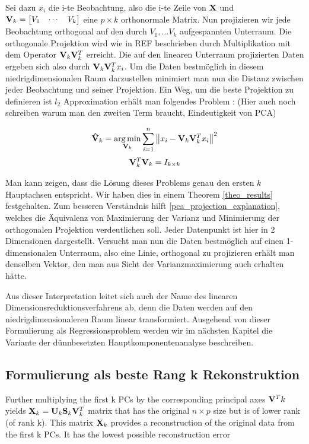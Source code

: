 Sei dazu $x_i$ die i-te Beobachtung, also die i-te Zeile von $\mathbf{X}$ und $\mathbf{V}_k = \begin{bmatrix} V_1 & \cdots & V_k \end{bmatrix}$ eine $p \times k$ orthonormale Matrix. Nun projizieren wir jede Beobachtung orthogonal auf den durch $V_1, \ldots V_k$ aufgespannten Unterraum. Die orthogonale Projektion wird wie in REF beschrieben durch Multiplikation mit dem Operator $\mathbf{V}_k \mathbf{V}_k^T$ erreicht. Die auf den linearen Unterraum projizierten Daten ergeben sich also durch $\mathbf{V}_k \mathbf{V}_k^T x_i$. Um die Daten bestmöglich in diesem niedrigdimensionalen Raum darzustellen minimiert man nun die Distanz zwischen jeder Beobachtung und seiner Projektion. Ein Weg, um die beste Projektion zu definieren ist $l_2$ Approximation erhält man folgendes Problem \cite{zou_sparsepca}: (Hier auch noch schreiben warum man den zweiten Term braucht, Eindeutigkeit von PCA)

\label{pca_regression_formulation}
$$\mathbf{\hat{V}}_k = \operatorname*{arg\,min}_{\mathbf{V}_k} \sum_{i=1}^{n} \left\lVert x_i - \mathbf{V}_k \mathbf{V}_k^Tx_i \right\rVert^2$$
$$\mathbf{V}_k^T\mathbf{V}_k = I_{k \times k}$$

Man kann zeigen, dass die Lösung dieses Problems genau den ersten $k$ Hauptachsen entspricht. Wir haben dies in einem Theorem \ref{theo_results} festgehalten.  \cite{vidal} Zum besseren Verständnis hilft \ref{pca_projection_explanation}, welches die Äquivalenz von Maximierung der Varianz und Minimierung der orthogonalen Projektion verdeutlichen soll. Jeder Datenpunkt ist hier in 2 Dimensionen dargestellt. Versucht man nun die Daten bestmöglich auf einen 1-dimensionalen Unterraum, also eine Linie, orthogonal zu projizieren erhält man denselben Vektor, den man aus Sicht der Varianzmaximierung auch erhalten hätte. 

Aus dieser Interpretation leitet sich auch der Name des linearen Dimensionsreduktionsverfahrens ab, denn die Daten werden auf den niedrigdimensionaleren Raum linear transformiert. Ausgehend von dieser Formulierung als Regressionsproblem werden wir im nächsten Kapitel die Variante der dünnbesetzten Hauptkomponentenanalyse beschreiben.

\subsection{Formulierung als beste Rang k Rekonstruktion}

Further multiplying the first k PCs by the corresponding principal axes $\mathbf{V}^T k$ yields $\mathbf{X}_k = \mathbf{U}_k \mathbf{S}_k \mathbf{V}_k^T$ matrix that has the original $n \times p$ size but is of lower rank (of rank k). This matrix $\mathbf{X}_k$ provides a reconstruction of the original data from the first k PCs. It has the lowest possible reconstruction error


